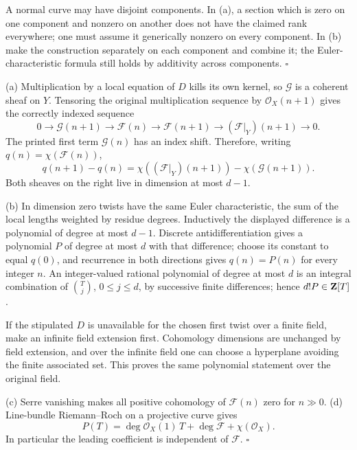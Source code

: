 \documentclass[11pt]{article}
\let\chapterexercise\exercise
\renewcommand{\exercise}[2]{\Needspace{8\baselineskip}\chapterexercise{#1}{#2}}
\begin{document}
A normal curve may have disjoint components. In (a), a section which is zero on one component and nonzero on another does not have the claimed rank everywhere; one must assume it generically nonzero on every component. In (b) make the construction separately on each component and combine it; the Euler-characteristic formula still holds by additivity across components. \hfill$\square$

\pf
(a) Multiplication by a local equation of $D$ kills its own kernel, so $\mathcal G$ is a coherent sheaf on $Y$. Tensoring the original multiplication sequence by $\mathcal O_X(n+1)$ gives the correctly indexed sequence
\[ 0\to\mathcal G(n+1)\to\mathcal F(n)\to\mathcal F(n+1)\to(\mathcal F|_Y)(n+1)\to0. \]
The printed first term $\mathcal G(n)$ has an index shift. Therefore, writing $q(n)=\chi(\mathcal F(n))$,
\[ q(n+1)-q(n)=\chi((\mathcal F|_Y)(n+1))-\chi(\mathcal G(n+1)). \]
Both sheaves on the right live in dimension at most $d-1$.

(b) In dimension zero twists have the same Euler characteristic, the sum of the local lengths weighted by residue degrees. Inductively the displayed difference is a polynomial of degree at most $d-1$. Discrete antidifferentiation gives a polynomial $P$ of degree at most $d$ with that difference; choose its constant to equal $q(0)$, and recurrence in both directions gives $q(n)=P(n)$ for every integer $n$. An integer-valued rational polynomial of degree at most $d$ is an integral combination of $\binom{T}{j}$, $0\le j\le d$, by successive finite differences; hence $d!P\in\mathbf Z[T]$.

If the stipulated $D$ is unavailable for the chosen first twist over a finite field, make an infinite field extension first. Cohomology dimensions are unchanged by field extension, and over the infinite field one can choose a hyperplane avoiding the finite associated set. This proves the same polynomial statement over the original field.

(c) Serre vanishing makes all positive cohomology of $\mathcal F(n)$ zero for $n\gg0$. (d) Line-bundle Riemann--Roch on a projective curve gives
\[ P(T)=\deg\mathcal O_X(1)\,T+\deg\mathcal F+\chi(\mathcal O_X). \]
In particular the leading coefficient is independent of $\mathcal F$. \hfill$\square$
\end{document}
